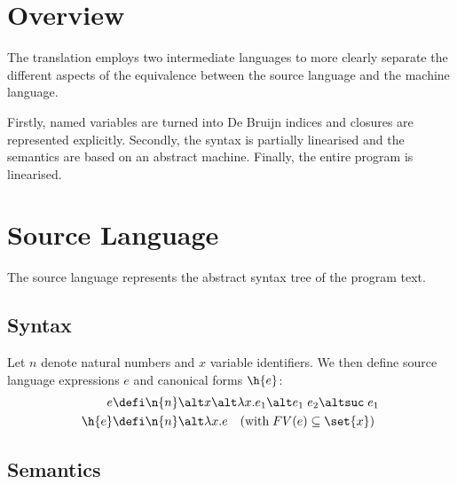 \documentclass[12pt]{article}
\newcommand{\ensurecommand}[1]{\providecommand{#1}{}\renewcommand{#1}}
\begin{document}
\section*{Overview}

The translation employs two intermediate languages to more clearly separate the different aspects of the equivalence between the source language and the machine language.

Firstly, named variables are turned into De Bruijn indices and closures are represented explicitly.
Secondly, the syntax is partially linearised and the semantics are based on an abstract machine.
Finally, the entire program is linearised.

\section*{Source Language}
The source language represents the abstract syntax tree of the program text.

\subsection*{Syntax}

\ensurecommand{\hexp}{e}
\ensurecommand{\hval}{\h{e}}

\ensurecommand{\nat}{n}
\ensurecommand{\var}{x}
\ensurecommand{\lam}[2]{\lambda #1. #2}
\ensurecommand{\app}[2]{#1 \; #2}
\ensurecommand{\hsuc}[1]{\mathtt{suc} \; #1}

Let $\nat$ denote natural numbers and $\var$ variable identifiers. We then define source language expressions $\hexp$ and canonical forms $\hval$:
\begin{align*}
  \hexp &\defi \n{\nat} \alt \var \alt \lam{\var}{\hexp_1} \alt \app{\hexp_1}{\hexp_2} \alt \hsuc{\hexp_1} \\
  \hval &\defi \n{\nat} \alt \lam{\var}{\hexp} \quad (\text{with} \; FV(\hexp) \subseteq \set{\var}) \\
\end{align*}


\subsection*{Semantics}
\end{document}
